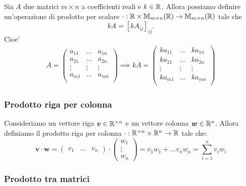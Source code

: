 Sia $A$ due matrici $m \times n$ a coefficienti reali e $k \in \mathbb{R}$. Allora possiamo definire un'operazione di prodotto per scalare $\cdot : \mathbb{R} \times \mathbb{M}_{m \times n}(\mathbb{R}) \to \mathbb{M}_{m \times n}(\mathbb{R})$ tale che \begin{equation}
    kA = [kA_{ij}]_{ij}.
\end{equation}
Cioe' \begin{gather*}
    A = \begin{pmatrix}
        a_{11}  & \dots     & a_{1n} \\
        a_{21}  & \dots     & a_{2n} \\
        \vdots  & \vdots    & \vdots \\
        a_{m1}  & \dots     & a_{mn} \\
    \end{pmatrix}
    \implies
    kA = \begin{pmatrix}
        ka_{11}  & \dots     & ka_{1n} \\
        ka_{21}  & \dots     & ka_{2n} \\
        \vdots   & \vdots    & \vdots \\
        ka_{m1}  & \dots     & ka_{mn} \\
    \end{pmatrix}  
\end{gather*}

\subsubsection{Prodotto riga per colonna}

Consideriamo un vettore riga $\bm{v} \in \mathbb{R}^{\times n}$ e un vettore colonna $\bm{w} \in \mathbb{R}^n$. Allora definiamo il prodotto riga per colonna $\cdot : \mathbb{R}^{\times n} \times \mathbb{R}^n \to \mathbb{R}$ tale che:
\begin{equation}
    \bm v \cdot \bm w = \begin{pmatrix}
        v_1 & \dots & v_n 
    \end{pmatrix} \cdot \begin{pmatrix}
        w_1 \\ \vdots \\ w_n
    \end{pmatrix} = v_1w_1 + \dots v_nw_n = \sum_{i = 1}^n v_iw_i
\end{equation}

\subsubsection{Prodotto tra matrici}

